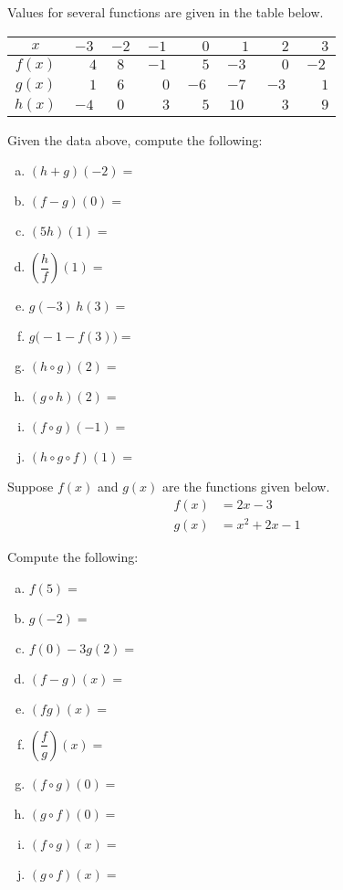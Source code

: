 \documentclass[11pt,letterpaper]{article}
\begin{document}
\prob Values for several functions are given in the table below. 
        \begin{table}[H]
        \centering
        \begin{tabular}{| c || c | c | c | c | c | c | c |} \hline
	$x$ & $-3$ & $-2$ & $-1$ & $\phantom{-}0$ & $\phantom{-}1$ & $\phantom{-}2$ & $\phantom{-}3$ \\ \hline \hline
	$f(x)$ & $\phantom{-}4$ & $8$ & $-1$ & $\phantom{-}5$ & $-3$ & $\phantom{-}0$ & $-2$ \\ \hline
	$g(x)$ & $\phantom{-}1$ & $6$ & $\phantom{-}0$ & $-6$ & $-7$ & $-3$ & $\phantom{-}1$ \\ \hline
	$h(x)$ & $-4$ & $0$ & $\phantom{-}3$ & $\phantom{-}5$ & $10$ & $\phantom{-}3$ & $\phantom{-}9$ \\ \hline
        \end{tabular}
        \end{table}

Given the data above, compute the following: 
        \begin{enumerate}[(a)]
        \item $(h + g)(-2)=$ 
        \item $(f - g)(0)=$ 
        \item $(5h)(1)=$ 
        \item $\left(\dfrac{h}{f}\right)(1)=$ 
        \item $g(-3)\, h(3)=$ 
        \item $g \big(-1 - f(3) \big)=$ 
        \item $(h \circ g)(2)=$ 
	\item $(g \circ h)(2)=$ 
        \item $(f \circ g)(-1)=$ 
	\item $(h \circ g \circ f)(1)=$ 
        \end{enumerate} \pspace


\prob Suppose $f(x)$ and $g(x)$ are the functions given below. 
	\[
	\begin{aligned}
	f(x)&= 2x - 3 \\[0.3cm]
	g(x)&= x^2 + 2x - 1
	\end{aligned}
	\]

Compute the following: \pspace
        \begin{enumerate}[(a)]
        \item $f(5)=$ 
        \item $g(-2)=$ 
        \item $f(0) - 3g(2)=$ 
        \item $(f - g)(x)=$ 
        \item $(fg)(x)=$ 
        \item $\left( \dfrac{f}{g} \right)(x)=$ 
        \item $(f \circ g)(0)=$ 
        \item $(g \circ f)(0)=$ 
        \item $(f \circ g)(x)=$ 
        \item $(g \circ f)(x)=$ 
        \end{enumerate} \pspace
\end{document}
